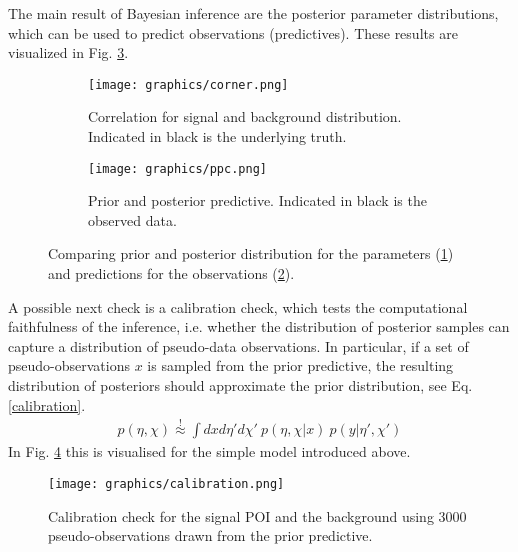 \noindent The main result of Bayesian inference are the posterior parameter distributions, which can be used to predict observations (predictives). These results are visualized in Fig. \ref{ppc_corner}. 
    \begin{figure} %
        \centering
             \begin{subfigure}[b]{0.35\textwidth}
                 \centering
                 \texttt{[image: graphics/corner.png]}
                 \caption{Correlation for signal and background distribution. Indicated in black is the underlying truth.}
                 \label{corner}
             \end{subfigure}
        \hspace{0.2\textwidth}
             \begin{subfigure}[b]{0.3\textwidth}
                 \centering
                 \texttt{[image: graphics/ppc.png]}
                 \caption{Prior and posterior predictive. Indicated in black is the observed data.}
                 \label{ppc}
             \end{subfigure}
        \caption{Comparing prior and posterior distribution for the parameters (\ref{corner}) and predictions for the observations (\ref{ppc}).}
        \label{ppc_corner}
    \end{figure}
\noindent A possible next check is a calibration check, which tests the computational faithfulness of the inference, i.e. whether the distribution of posterior samples can capture a distribution of pseudo-data observations. In particular, if a set of pseudo-observations $x$ is sampled from the prior predictive, the resulting distribution of posteriors should approximate the prior distribution, see Eq.\ref{calibration}. 
    \begin{align} \label{calibration}
        p\left(\eta, \chi\right) \overset{!} \approx \int dxd\eta' d\chi' ~  p\left( \eta, \chi | x \right) ~ p\left(y|\eta', \chi'\right)  
    \end{align}
\noindent In Fig. \ref{calibrationPlot} this is visualised for the simple model introduced above. 
    \begin{figure} %
        \centering
        \texttt{[image: graphics/calibration.png]}
        \centering
        \caption{Calibration check for the signal POI and the background using 3000 pseudo-observations drawn from the prior predictive.}
        \label{calibrationPlot}
    \end{figure} 